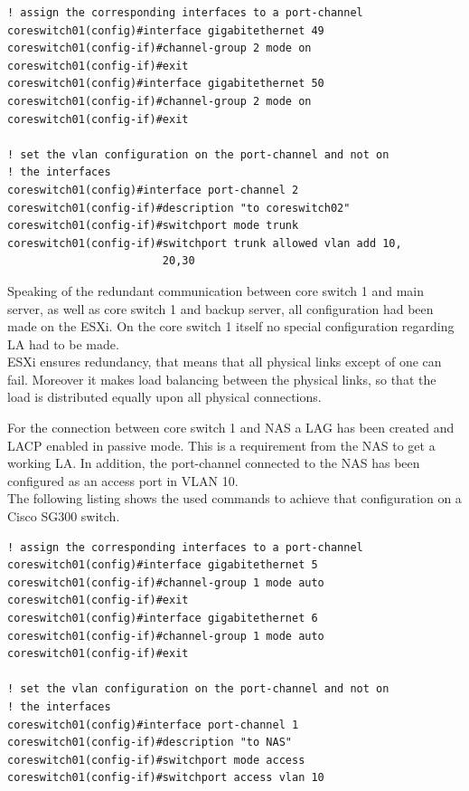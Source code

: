 \begin{lstlisting}
! assign the corresponding interfaces to a port-channel
coreswitch01(config)#interface gigabitethernet 49
coreswitch01(config-if)#channel-group 2 mode on
coreswitch01(config-if)#exit
coreswitch01(config)#interface gigabitethernet 50
coreswitch01(config-if)#channel-group 2 mode on
coreswitch01(config-if)#exit

! set the vlan configuration on the port-channel and not on 
! the interfaces
coreswitch01(config)#interface port-channel 2
coreswitch01(config-if)#description "to coreswitch02"
coreswitch01(config-if)#switchport mode trunk
coreswitch01(config-if)#switchport trunk allowed vlan add 10,
                        20,30
\end{lstlisting} 

Speaking of the redundant communication between core switch 1 and main server, as well as core switch 1 and backup server, all configuration had been made on the ESXi. On the core switch 1 itself no special configuration regarding \ac{LA} had to be made. \\
ESXi ensures redundancy, that means that all physical links except of one can fail. Moreover it makes load balancing between the physical links, so that the load is distributed equally upon all physical connections.

For the connection between core switch 1 and \ac{NAS} a \ac{LAG} has been created and \ac{LACP} enabled in passive mode. This is a requirement from the \ac{NAS} to get a working \ac{LA}. In addition, the port-channel connected to the NAS has been configured as an access port in VLAN 10. \\
The following listing shows the used commands to achieve that configuration on a Cisco SG300 switch.

\begin{lstlisting}
! assign the corresponding interfaces to a port-channel
coreswitch01(config)#interface gigabitethernet 5
coreswitch01(config-if)#channel-group 1 mode auto
coreswitch01(config-if)#exit
coreswitch01(config)#interface gigabitethernet 6
coreswitch01(config-if)#channel-group 1 mode auto
coreswitch01(config-if)#exit

! set the vlan configuration on the port-channel and not on 
! the interfaces
coreswitch01(config)#interface port-channel 1
coreswitch01(config-if)#description "to NAS"
coreswitch01(config-if)#switchport mode access
coreswitch01(config-if)#switchport access vlan 10
\end{lstlisting} 

